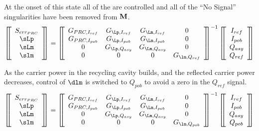 \documentclass[12pt]{article}
\begin{document}
At the onset of this state all of the \dsf{} are controlled and all of the
 ``No Signal'' singularities have been removed from $\mathbf{M}$.
\begin{equation*}
\matrixBegin{c}
 \slp \\
 \sLp \\
 \sLm \\
 \slm \\
\matrixEnd
 =
\matrixBegin{cccc}
 G_{\lp, I_{ref}} & G_{\Lp, I_{ref}} & G_{\Lm, I_{ref}} & 0 \\
 G_{\lp, I_{pob}} & G_{\Lp, I_{pob}} & G_{\Lm, I_{pob}} & 0 \\
 0                & G_{\Lp, Q_{asy}} & G_{\Lm, Q_{asy}} & 0 \\
 0                & 0 & 0 & G_{\lm, Q_{ref}} \\
\matrixEnd^{-1}
\matrixBegin{c}
 I_{ref} \\
 I_{pob} \\
 Q_{asy} \\
 Q_{ref} \\
\matrixEnd
\end{equation*}

As the carrier power in the recycling cavity builds,
 and the reflected carrier power decreases,
 control of $\dlm$ is switched to $Q_{pob}$ to avoid a
 zero in the $Q_{ref}$ signal.
\begin{equation*}
\matrixBegin{c}
 \slp \\
 \sLp \\
 \sLm \\
 \slm \\
\matrixEnd
 =
\matrixBegin{cccc}
 G_{\lp, I_{ref}} & G_{\Lp, I_{ref}} & G_{\Lm, I_{ref}} & 0 \\
 G_{\lp, I_{pob}} & G_{\Lp, I_{pob}} & G_{\Lm, I_{pob}} & 0 \\
 0                & G_{\Lp, Q_{asy}} & G_{\Lm, Q_{asy}} & 0 \\
 0                & 0 & 0 & G_{\lm, Q_{pob}} \\
\matrixEnd^{-1}
\matrixBegin{c}
 I_{ref} \\
 I_{pob} \\
 Q_{asy} \\
 Q_{pob} \\
\matrixEnd
\end{equation*}
\end{document}
